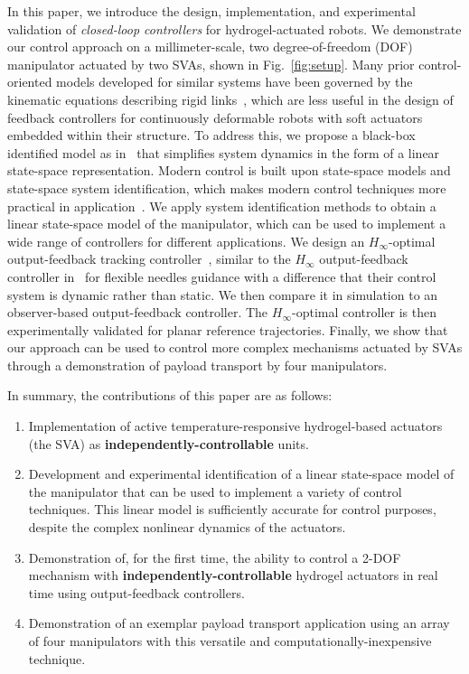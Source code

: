 In this paper, we introduce the design, implementation, and experimental validation of {\it closed-loop controllers} for hydrogel-actuated robots. We demonstrate our control approach on a millimeter-scale, two degree-of-freedom (DOF) manipulator actuated by two SVAs, shown in Fig.~\ref{fig:setup}. Many prior control-oriented models developed for similar systems have been governed by the kinematic equations describing rigid links~\cite{webster2010,sorkhabadi2019human}, which are less useful in the design of feedback controllers for continuously deformable robots with soft actuators embedded within their structure. To address this, we propose a black-box identified model as in~\cite{ljung2010,schaller2019robotic} that simplifies system dynamics in the form of a linear state-space representation. Modern control is built upon state-space models and state-space system identification, which  makes modern control techniques more practical in application~\cite{lim1998state,chinimilli2020assessment}. We apply system identification methods to obtain a linear state-space model of the manipulator, which can be used to implement a wide range of controllers for different applications. We design an $H_{\infty}$-optimal output-feedback tracking controller~\cite{aastrom2010},  similar to the $H_{\infty}$ output-feedback controller in~\cite{farhamfard2016h} for flexible needles guidance with a difference that their control system is dynamic rather than static. We then compare it in simulation to an observer-based output-feedback controller. The $H_{\infty}$-optimal controller is then experimentally validated for planar reference trajectories. Finally, we show that our approach can be used to control more complex mechanisms actuated by SVAs through a demonstration of payload transport by four manipulators.

In summary, the contributions of this paper are as follows:

\begin{enumerate}
    \item Implementation of active temperature-responsive hydrogel-based actuators (the SVA) as \textbf{independently-controllable} units. 
   \item Development and experimental identification of a linear state-space model of the manipulator that can be used to implement a variety of control techniques. This linear model is sufficiently accurate for control purposes, despite the complex nonlinear dynamics of the actuators.
    \item Demonstration of, for the first time, the ability to control a 2-DOF mechanism with \textbf{independently-controllable} hydrogel actuators in real time using output-feedback controllers. 
    \item Demonstration of an exemplar payload transport application using an array of four manipulators with this versatile and computationally-inexpensive technique.
\end{enumerate}

